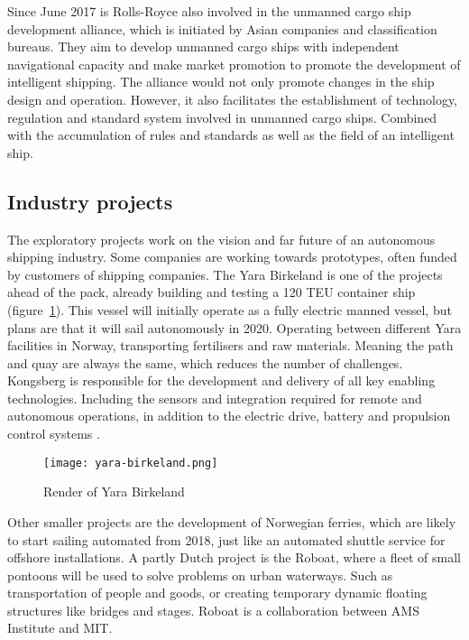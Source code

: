 Since June 2017 is Rolls-Royce also involved in the unmanned cargo ship development alliance, which is initiated by Asian companies and classification bureaus. They aim to develop unmanned cargo ships with independent navigational capacity and make market promotion to promote the development of intelligent shipping.
The alliance would not only promote changes in the ship design and operation. However, it also facilitates the establishment of technology, regulation and standard system involved in unmanned cargo ships. Combined with the accumulation of rules and standards as well as the field of an intelligent ship.

\subsection{Industry projects}
The exploratory projects work on the vision and far future of an autonomous shipping industry. Some companies are working towards prototypes, often funded by customers of shipping companies.
The Yara Birkeland is one of the projects ahead of the pack, already building and testing a 120 \ac{TEU} container ship (figure~\ref{fig:yara-birkeland}). This vessel will initially operate as a fully electric manned vessel, but plans are that it will sail autonomously in 2020. Operating between different Yara facilities in Norway, transporting fertilisers and raw materials. Meaning the path and quay are always the same, which reduces the number of challenges.
Kongsberg is responsible for the development and delivery of all key enabling technologies. Including the sensors and integration required for remote and autonomous operations, in addition to the electric drive, battery and propulsion control systems \cite{Sames2017}.

\begin{figure}[p]
	\centering
	\texttt{[image: yara-birkeland.png]}
	\caption{Render of Yara Birkeland}
	\label{fig:yara-birkeland}
\end{figure}

Other smaller projects are the development of Norwegian ferries, which are likely to start sailing automated from 2018, just like an automated shuttle service for offshore installations. A partly Dutch project is the Roboat, where a fleet of small pontoons will be used to solve problems on urban waterways. Such as transportation of people and goods, or creating temporary dynamic floating structures like bridges and stages. Roboat is a collaboration between AMS Institute and MIT.

